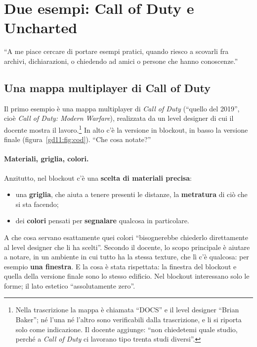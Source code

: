 \section{Due esempi: Call of Duty e Uncharted}
\label{gd11:sec:esempi-blockout}



``A me piace cercare di portare esempi pratici, quando riesco a scovarli fra
archivi, dichiarazioni, o chiedendo ad amici o persone che hanno conoscenze.''

\subsection{Una mappa multiplayer di Call of Duty}

Il primo esempio è una mappa multiplayer di \emph{Call of Duty} (``quello del
2019'', cioè \emph{Call of Duty: Modern Warfare}), realizzata da un level
designer di cui il docente mostra il lavoro.\footnote{Nella trascrizione la
mappa è chiamata ``DOCS'' e il level designer ``Brian Baker''; né l'una né
l'altro sono verificabili dalla trascrizione, e li si riporta solo come
indicazione. Il docente aggiunge: ``non chiedetemi quale studio, perché a
\emph{Call of Duty} ci lavorano tipo trenta studi diversi''.} In alto c'è la
versione in blockout, in basso la versione finale (figura~\ref{gd11:fig:cod}).
``Che cosa notate?''

\paragraph{Materiali, griglia, colori.} Anzitutto, nel blockout c'è una
\textbf{scelta di materiali precisa}:
\begin{itemize}
  \item una \textbf{griglia}, che aiuta a tenere presenti le distanze, la
        \textbf{metratura} di ciò che si sta facendo;
  \item dei \textbf{colori} pensati per \textbf{segnalare} qualcosa in
        particolare.
\end{itemize}
A che cosa servano esattamente quei colori ``bisognerebbe chiederlo
direttamente al level designer che li ha scelti''. Secondo il docente, lo scopo
principale è aiutare a notare, in un ambiente in cui tutto ha la stessa
texture, che lì c'è qualcosa: per esempio \textbf{una finestra}. E la cosa è
stata rispettata: la finestra del blockout e quella della versione finale sono
lo stesso edificio. Nel blockout interessano solo le forme; il lato estetico
``assolutamente zero''.

